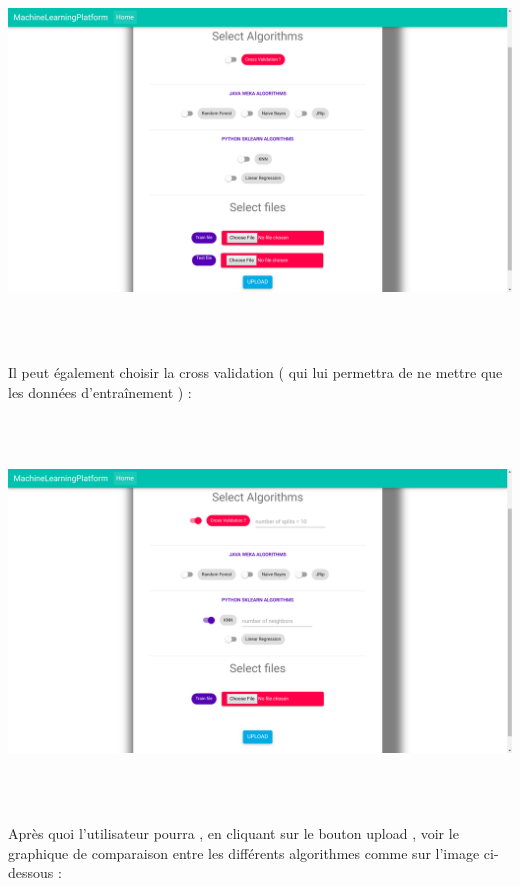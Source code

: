 \documentclass[a4paper,11pt]{article}
\begin{document}
\includegraphics[width=17cm, height=10cm]{upload.png}\\\\
Il peut également choisir la cross validation ( qui lui permettra de ne mettre que les données d’entraînement ) :\\\\

\includegraphics[width=17cm, height=10cm]{upload_cv_knn.png}\\\\

Après quoi l'utilisateur pourra , en cliquant sur le bouton \og upload \fg, voir le graphique de comparaison entre les différents algorithmes comme sur l'image ci-dessous :\\\\
\end{document}
